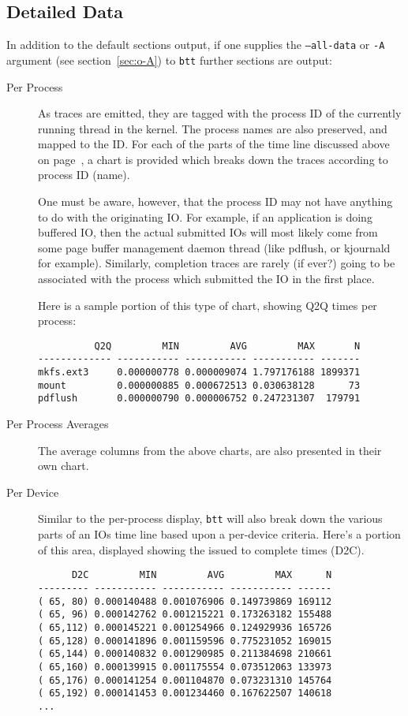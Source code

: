 \documentclass{article}
\begin{document}
\newpage
\subsection*{\label{sec:detailed-data}Detailed Data}

  In addition to the default sections output, if one supplies the
  \texttt{--all-data} or \texttt{-A} argument (see section~\ref{sec:o-A})
  to \texttt{btt} further sections are output:

\begin{description}
  \item[Per Process] As traces are emitted, they are tagged with the
  process ID of the currently running thread in the kernel. The process
  names are also preserved, and mapped to the ID. For each of the parts
  of the time line discussed above on page~\pageref{tl-defs}, a chart is
  provided which breaks down the traces according to process ID (name).

  One must be aware, however, that the process ID may not have anything
  to do with the originating IO. For example, if an application is
  doing buffered IO, then the actual submitted IOs will most likely
  come from some page buffer management daemon thread (like pdflush,
  or kjournald for example). Similarly, completion traces are rarely
  (if ever?) going to be associated with the process which submitted
  the IO in the first place.

  Here is a sample portion of this type of chart, showing Q2Q times
  per process:

\begin{verbatim}
          Q2Q         MIN         AVG         MAX       N
------------- ----------- ----------- ----------- -------
mkfs.ext3     0.000000778 0.000009074 1.797176188 1899371
mount         0.000000885 0.000672513 0.030638128      73
pdflush       0.000000790 0.000006752 0.247231307  179791
\end{verbatim}

  \item[Per Process Averages] The average columns from the above charts,
  are also presented in their own chart.

  \item[Per Device] Similar to the per-process display, \texttt{btt}
  will also break down the various parts of an IOs time line based upon a
  per-device criteria. Here's a portion of this area, displayed showing
  the issued to complete times (D2C).

\begin{verbatim}
      D2C         MIN         AVG         MAX      N
--------- ----------- ----------- ----------- ------
( 65, 80) 0.000140488 0.001076906 0.149739869 169112
( 65, 96) 0.000142762 0.001215221 0.173263182 155488
( 65,112) 0.000145221 0.001254966 0.124929936 165726
( 65,128) 0.000141896 0.001159596 0.775231052 169015
( 65,144) 0.000140832 0.001290985 0.211384698 210661
( 65,160) 0.000139915 0.001175554 0.073512063 133973
( 65,176) 0.000141254 0.001104870 0.073231310 145764
( 65,192) 0.000141453 0.001234460 0.167622507 140618
...
\end{verbatim}


\end{description}
\end{document}
